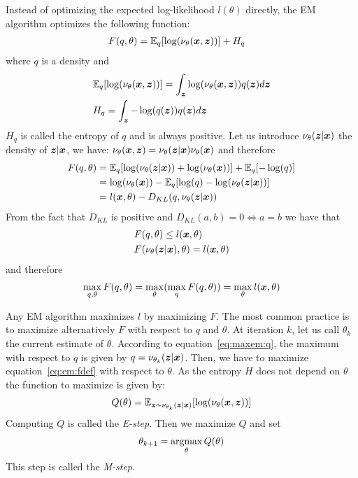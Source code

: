 Instead of optimizing the expected log-likelihood $l(\theta)$ directly, the EM algorithm optimizes the following function:
\begin{align}
  F(q, \theta) &= \mathbb{E}_q[\log( \nu_{\theta}(\boldsymbol{x}, \boldsymbol{z}))] + H_q \label{eq:em:fdef}
\end{align}
where $q$ is a density and 
\begin{align}
  &\mathbb{E}_q[\log( \nu_{\theta}(\boldsymbol{x}, \boldsymbol{z}))] = \int_{\boldsymbol{z}} \log( \nu_{\theta}(\boldsymbol{x}, \boldsymbol{z})) q(\boldsymbol{z}) d\boldsymbol{z}  \\
  &H_q = \int_{\boldsymbol{z}} -\log(q(\boldsymbol{z})) q(\boldsymbol{z}) d\boldsymbol{z} 
\end{align}
$H_q$ is called the entropy of $q$ and is always positive.
Let us introduce $\nu_{\theta}(\boldsymbol{z} | \boldsymbol{x})$ the density of $\boldsymbol{z} | \boldsymbol{x}$, we have:
$\nu_{\theta}(\boldsymbol{x}, \boldsymbol{z}) = \nu_{\theta}(\boldsymbol{z} | \boldsymbol{x}) \nu_{\theta}(\boldsymbol{x})$ and
therefore
\begin{align}
  F(q, \theta) &= \mathbb{E}_q[\log( \nu_{\theta}(\boldsymbol{z}| \boldsymbol{x})) + \log( \nu_{\theta}(\boldsymbol{x}))] + \mathbb{E}_q[-\log(q)] \\
  &= \log(\nu_{\theta}(\boldsymbol{x})) - \mathbb{E}_q[ \log(q) - \log( \nu_{\theta}(\boldsymbol{z}| \boldsymbol{x}))] \\
               &= l(\boldsymbol{x}, \theta) - D_{KL}(q, \nu_{\theta}(\boldsymbol{z}| \boldsymbol{x}))
\end{align}
From the fact that $D_{KL}$ is positive and $D_{KL}(a, b) = 0 \iff a = b$ we
have that
\begin{align}
  &F(q, \theta) \leq l(\boldsymbol{x}, \theta) \\
  &F(\nu_{\theta}(\boldsymbol{z}| \boldsymbol{x}), \theta) = l(\boldsymbol{x}, \theta) \label{eq:maxem:q}
\end{align}
and therefore
\begin{align}
  \max_{q, \theta} F(q, \theta) = \max_{\theta} (\max_q F(q, \theta)) = \max_{\theta} l(\boldsymbol{x}, \theta)
\end{align}

Any EM algorithm maximizes $l$ by maximizing $F$.
The most common practice is to maximize alternatively $F$ with respect to
$q$ and $\theta$.
At iteration $k$, let us call $\theta_k$ the current estimate of $\theta$.
According to equation~\eqref{eq:maxem:q}, the maximum with
respect to $q$ is given by $q=\nu_{\theta_k}(\boldsymbol{z}| \boldsymbol{x})$. Then, we have to
maximize equation~\eqref{eq:em:fdef} with respect to $\theta$.
As the entropy $H$ does not depend on $\theta$ the function to maximize is given
by:
\begin{align}
  Q(\theta ) =  \mathbb{E}_{\boldsymbol{z} \sim \nu_{\theta_k }(\boldsymbol{z} | \boldsymbol{x})}[\log( \nu_{\theta }(\boldsymbol{x}, \boldsymbol{z}))]
\end{align}
Computing $Q$ is called the \emph{E-step}. Then we maximize $Q$ and set
\begin{align}
  \theta_{k+1} = \operatorname*{argmax}_{\theta} Q(\theta) \label{eq:exact:mstep}
\end{align}
This step is called the \emph{M-step}.

